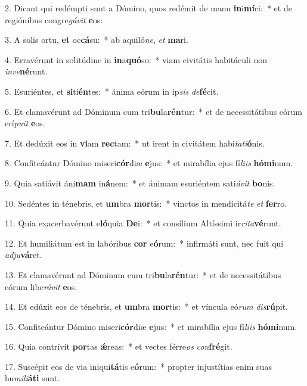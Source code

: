 2. Dicant qui redémpti sunt a Dómino, quos redémit de manu \textbf{in}i\textbf{mí}ci:~*  et de regiónibus congre\textit{gá}\textit{vit} \textbf{e}os:\

3. A solis ortu, \textbf{et} oc\textbf{cá}su:~*  ab aquiló\textit{ne}, \textit{et} \textbf{ma}ri.\

4. Erravérunt in solitúdine in \textbf{in}a\textbf{quó}so:~*  viam civitátis habitáculi non \textit{in}\textit{ve}\textbf{né}runt.\

5. Esuriéntes, et \textbf{si}ti\textbf{én}tes:~*  ánima eórum in ip\textit{sis} \textit{de}\textbf{fé}cit.\

6. Et clamavérunt ad Dóminum cum tri\textbf{bu}la\textbf{rén}tur:~*  et de necessitátibus eórum erí\textit{pu}\textit{it} \textbf{e}os.\

7. Et dedúxit eos in \textbf{vi}am \textbf{rec}tam:~*  ut irent in civitátem habi\textit{ta}\textit{ti}\textbf{ó}nis.\

8. Confiteántur Dómino miseri\textbf{cór}diæ \textbf{e}jus:~*  et mirabília ejus fí\textit{li}\textit{is} \textbf{hó}\textbf{mi}num.\

9. Quia satiávit áni\textbf{mam} in\textbf{á}nem:~*  et ánimam esuriéntem sati\textit{á}\textit{vit} \textbf{bo}nis.\

10. Sedéntes in ténebris, et \textbf{um}bra \textbf{mor}tis:~*  vinctos in mendicitá\textit{te} \textit{et} \textbf{fer}ro.\

11. Quia exacerbavérunt e\textbf{ló}quia \textbf{De}i:~*  et consílium Altíssimi ir\textit{ri}\textit{ta}\textbf{vé}runt.\

12. Et humiliátum est in labóribus \textbf{cor} e\textbf{ó}rum:~*  infirmáti sunt, nec fuit qui \textit{ad}\textit{ju}\textbf{vá}ret.\

13. Et clamavérunt ad Dóminum cum tri\textbf{bu}la\textbf{rén}tur:~*  et de necessitátibus eórum libe\textit{rá}\textit{vit} \textbf{e}os.\

14. Et edúxit eos de ténebris, et \textbf{um}bra \textbf{mor}tis:~*  et víncula eó\textit{rum} \textit{dis}\textbf{rú}pit.\

15. Confiteántur Dómino miseri\textbf{cór}diæ \textbf{e}jus:~*  et mirabília ejus fí\textit{li}\textit{is} \textbf{hó}\textbf{mi}num.\

16. Quia contrívit \textbf{por}tas \textbf{ǽ}reas:~*  et vectes férre\textit{os} \textit{con}\textbf{fré}git.\

17. Suscépit eos de via iniqui\textbf{tá}tis e\textbf{ó}rum:~*  propter injustítias enim suas hu\textit{mi}\textit{li}\textbf{á}\textbf{ti} sunt.\

